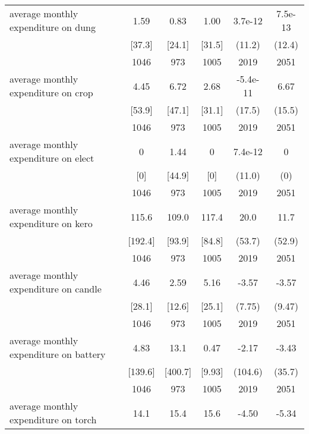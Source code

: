 \begin{table}[htbp]
\begin{tabular*}{0.9\hsize}{@{\hskip\tabcolsep\extracolsep\fill}l*{1}{ccccc}}
average monthly expenditure on dung&     1.59&     0.83&     1.00&  3.7e-12         &  7.5e-13         \\
                                &   [37.3]&   [24.1]&   [31.5]&   (11.2)         &   (12.4)         \\
                                &     1046&      973&     1005&     2019         &     2051         \\
average monthly expenditure on crop&     4.45&     6.72&     2.68& -5.4e-11         &     6.67         \\
                                &   [53.9]&   [47.1]&   [31.1]&   (17.5)         &   (15.5)         \\
                                &     1046&      973&     1005&     2019         &     2051         \\
average monthly expenditure on elect&        0&     1.44&        0&  7.4e-12         &        0         \\
                                &      [0]&   [44.9]&      [0]&   (11.0)         &      (0)         \\
                                &     1046&      973&     1005&     2019         &     2051         \\
average monthly expenditure on kero&    115.6&    109.0&    117.4&     20.0         &     11.7         \\
                                &  [192.4]&   [93.9]&   [84.8]&   (53.7)         &   (52.9)         \\
                                &     1046&      973&     1005&     2019         &     2051         \\
average monthly expenditure on candle&     4.46&     2.59&     5.16&    -3.57         &    -3.57         \\
                                &   [28.1]&   [12.6]&   [25.1]&   (7.75)         &   (9.47)         \\
                                &     1046&      973&     1005&     2019         &     2051         \\
average monthly expenditure on battery&     4.83&     13.1&     0.47&    -2.17         &    -3.43         \\
                                &  [139.6]&  [400.7]&   [9.93]&  (104.6)         &   (35.7)         \\
                                &     1046&      973&     1005&     2019         &     2051         \\
average monthly expenditure on torch&     14.1&     15.4&     15.6&    -4.50         &    -5.34         \\

\end{tabular*}
\end{table}
